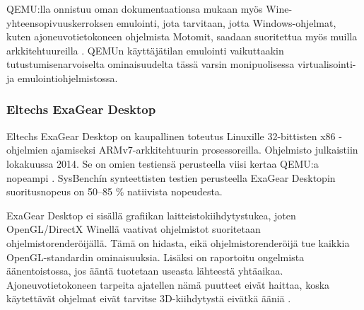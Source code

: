 QEMU:lla onnistuu oman dokumentaationsa mukaan myös Wine-yhteensopivuuskerroksen emulointi, jota tarvitaan, jotta Windows-ohjelmat, kuten ajoneuvotietokoneen ohjelmista Motomit, saadaan suoritettua myös muilla arkkitehtuureilla \cite{qemu_use}. QEMUn käyttäjätilan emulointi vaikuttaakin tutustumisenarvoiselta ominaisuudelta tässä varsin monipuolisessa virtualisointi- ja emulointiohjelmistossa.


\subsubsection{Eltechs ExaGear Desktop}
Eltechs ExaGear Desktop on kaupallinen toteutus Linuxille 32-bittisten x86 -ohjelmien ajamiseksi ARMv7-arkkitehtuurin prosessoreilla. Ohjelmisto julkaistiin lokakuussa 2014. Se on omien testiensä perusteella viisi kertaa QEMU:a nopeampi \cite{eltechs:exagear}. SysBenchín synteettisten testien perusteella ExaGear Desktopin suoritusnopeus on 50--85 \% natiivista nopeudesta.

ExaGear Desktop ei sisällä grafiikan laitteistokiihdytystukea, joten OpenGL/DirectX Winellä vaativat ohjelmistot suoritetaan ohjelmistorenderöijällä. Tämä on hidasta, eikä ohjelmistorenderöijä tue kaikkia OpenGL-standardin ominaisuuksia. Lisäksi on raportoitu ongelmista äänentoistossa, jos ääntä tuotetaan useasta lähteestä yhtäaikaa. Ajoneuvotietokoneen tarpeita ajatellen nämä puutteet eivät haittaa, koska käytettävät ohjelmat eivät tarvitse 3D-kiihdytystä eivätkä ääniä \cite{eltechs:odroid}.

